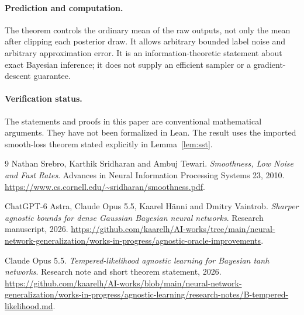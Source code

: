 \documentclass[11pt]{article}
\theoremstyle{definition}\newtheorem{definition}[theorem]{Definition}
\theoremstyle{remark}\newtheorem{remark}[theorem]{Remark}
\begin{document}
\paragraph{Prediction and computation.}
The theorem controls the ordinary mean of the raw outputs, not only the mean after clipping each posterior draw. It allows arbitrary bounded label noise and arbitrary approximation error. It is an information-theoretic statement about exact Bayesian inference; it does not supply an efficient sampler or a gradient-descent guarantee.

\paragraph{Verification status.}
The statements and proofs in this paper are conventional mathematical arguments. They have not been formalized in Lean. The result uses the imported smooth-loss theorem stated explicitly in Lemma~\ref{lem:sst}.

\begin{thebibliography}{9}
Nathan Srebro, Karthik Sridharan and Ambuj Tewari.
\emph{Smoothness, Low Noise and Fast Rates}.
Advances in Neural Information Processing Systems 23, 2010.
\url{https://www.cs.cornell.edu/~sridharan/smoothness.pdf}.

ChatGPT-6 Astra, Claude Opus 5.5, Kaarel H\"anni and Dmitry Vaintrob.
\emph{Sharper agnostic bounds for dense Gaussian Bayesian neural networks}.
Research manuscript, 2026.
\url{https://github.com/kaarelh/AI-works/tree/main/neural-network-generalization/works-in-progress/agnostic-oracle-improvements}.

Claude Opus 5.5.
\emph{Tempered-likelihood agnostic learning for Bayesian tanh networks}.
Research note and short theorem statement, 2026.
\url{https://github.com/kaarelh/AI-works/blob/main/neural-network-generalization/works-in-progress/agnostic-learning/research-notes/B-tempered-likelihood.md}.
\end{thebibliography}
\end{document}
